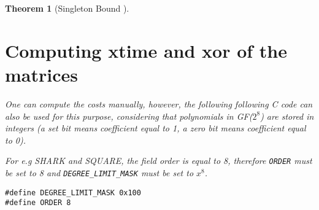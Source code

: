\documentclass{report}
\newtheorem{theorem}{Theorem}{\bfseries}{\itshape}
\begin{document}
\begin{theorem}[Singleton Bound \cite{SloaneBook}]

\section{Computing \textbf{xtime} and \textbf{xor} of the matrices}

One can compute the costs manually, however, the following following C code can also be used for this purpose, considering that polynomials in GF($2^8$) are stored in integers (a set bit means coefficient equal to 1, a zero bit means coefficient equal to 0).

For e.g SHARK and SQUARE, the field order is equal to 8, therefore \texttt{ORDER} must be set to 8 and \texttt{DEGREE_LIMIT_MASK} must be set to $x^8$.

\begin{verbatim}
#define DEGREE_LIMIT_MASK 0x100
#define ORDER 8
\end{verbatim}


\end{theorem}
\end{document}
